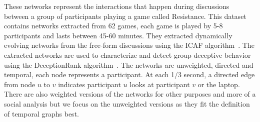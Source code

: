 These networks represent the interactions that happen during discussions between a group of participants playing a game called Resistance.
This dataset contains networks extracted from 62 games, each game is played by 5-8 participants and lasts between 45-60 minutes.
They extracted dynamically evolving networks from the free-form discussions using the ICAF algorithm~\cite{f2f-bai2019predicting}.
The extracted networks are used to characterize and detect group deceptive behavior using the DeceptionRank algorithm~\cite{f2f-kumar2021deception}.
The networks are unweighted, directed and temporal, each node represents a participant.
At each 1/3 second, a directed edge from node $u$ to $v$ indicates participant $u$ looks at participant $v$ or the laptop.
There are also weighted versions of the networks for other purposes and more of a social analysis but we focus on the unweighted versions as they fit the definition of temporal graphs best.